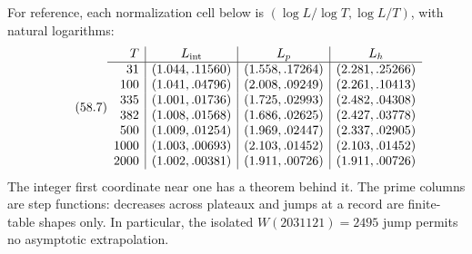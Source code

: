 \documentclass[10pt,reqno]{amsart}
\theoremstyle{definition}
\newcommand{\1}{\mathbf 1}
\begin{document}
For reference, each normalization cell below is
$(\log L/\log T,\log L/T)$, with natural logarithms:
\begin{equation}\tag{58.7}
\begin{array}{r|c|c|c}
T&L_{\rm int}&L_p&L_h\\ \hline
31 &(1.044,.11560)&(1.558,.17264)&(2.281,.25266)\\
100&(1.041,.04796)&(2.008,.09249)&(2.261,.10413)\\
335&(1.001,.01736)&(1.725,.02993)&(2.482,.04308)\\
382&(1.008,.01568)&(1.686,.02625)&(2.427,.03778)\\
500&(1.009,.01254)&(1.969,.02447)&(2.337,.02905)\\
1000&(1.003,.00693)&(2.103,.01452)&(2.103,.01452)\\
2000&(1.002,.00381)&(1.911,.00726)&(1.911,.00726)
\end{array}
\end{equation}
The integer first coordinate near one has a theorem behind it.  The prime
columns are step functions: decreases across plateaux and jumps at a record
are finite-table shapes only.  In particular, the isolated
$W(2031121)=2495$ jump permits no asymptotic extrapolation.
\end{document}
